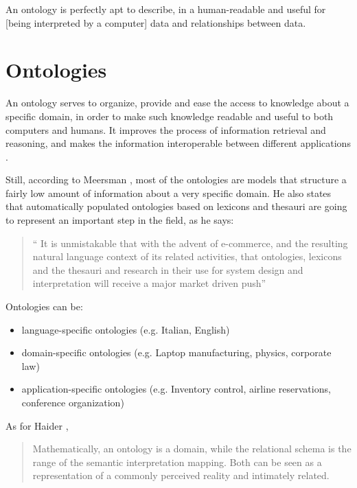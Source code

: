 \documentclass[LaM,oneside,binding=0.6cm]{sapthesis}
\begin{document}
An ontology is perfectly apt to describe, in a human-readable and useful for [being interpreted by a computer] data and relationships between data.

\section{Ontologies}

An ontology serves to organize, provide and ease the access to knowledge about a specific domain, in order to make such knowledge readable and useful to both computers and humans. It improves the process of information retrieval and reasoning, and makes the information interoperable between different applications \parencite{zhou_ontology-supported_2008}. 

Still, according to Meersman \parencite{meersman_use_2005}, most of the ontologies are models that structure a fairly low amount of information about a very specific domain. He also states that automatically populated ontologies based on lexicons and thesauri are going to represent an important step in the field, as he says:

\begin{quote}“ It is unmistakable that with the advent of e-commerce, and the resulting natural language
context of its related activities, that ontologies, lexicons and the thesauri and research in
their use for system design and interpretation will receive a major market driven push”
\end{quote}

Ontologies can be:
\begin{itemize}
	\item language-specific ontologies (e.g. Italian, English)
	\item domain-specific ontologies (e.g. Laptop manufacturing, physics, corporate law)
	\item application-specific ontologies (e.g. Inventory control, airline reservations, conference organization)
\end{itemize}

As for Haider \parencite{haider_ontology_2012},

\begin{quote}
Mathematically, an ontology is a domain, while the relational schema is the range of the semantic interpretation mapping. 
Both can be seen as a representation of a commonly perceived reality and intimately related.
\end{quote}
\end{document}
